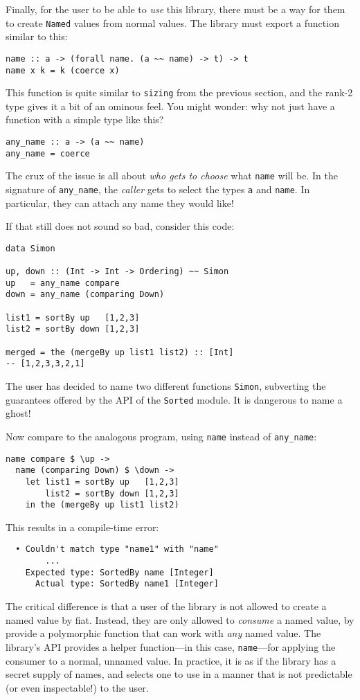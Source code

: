 \documentclass[format=sigplan, review=false, screen=true]{acmart}
\begin{document}
Finally, for the user to be able to \emph{use} this library, there must be a way for
them to create \texttt{Named} values from normal values. The library must export a
function similar to this:

\begin{verbatim}
name :: a -> (forall name. (a ~~ name) -> t) -> t
name x k = k (coerce x)
\end{verbatim}

This function is quite similar to \texttt{sizing} from the previous section, and the rank-2
type gives it a bit of an ominous feel. You might wonder: why not just have a function
with a simple type like this?

\begin{verbatim}
any_name :: a -> (a ~~ name)
any_name = coerce
\end{verbatim}

The crux of the issue is all about \emph{who gets to choose} what \texttt{name} will be.
In the signature of \texttt{any\_name}, the \emph{caller} gets to select the types \texttt{a}
and \texttt{name}. In particular, they can attach any name they would like!

If that still does not sound so bad, consider this code:

\begin{verbatim}
data Simon
  
up, down :: (Int -> Int -> Ordering) ~~ Simon
up   = any_name compare
down = any_name (comparing Down)

list1 = sortBy up   [1,2,3]
list2 = sortBy down [1,2,3]

merged = the (mergeBy up list1 list2) :: [Int]
-- [1,2,3,3,2,1]
\end{verbatim}
\noindent
The user has decided to name two different functions \texttt{Simon}, subverting the
guarantees offered by the API of the \texttt{Sorted} module. It is dangerous to
name a ghost!

Now compare to the analogous program, using \texttt{name} instead of \texttt{any\_name}:
\begin{verbatim}
name compare $ \up ->
  name (comparing Down) $ \down ->
    let list1 = sortBy up   [1,2,3]
        list2 = sortBy down [1,2,3]
    in the (mergeBy up list1 list2)
\end{verbatim}
\noindent
This results in a compile-time error:

\begin{lstlisting}
  • Couldn't match type "name1" with "name"
        ...
    Expected type: SortedBy name [Integer]
      Actual type: SortedBy name1 [Integer]
\end{lstlisting}
\noindent
The critical difference is that a user of the library is not allowed to create a named
value by fiat. Instead, they are only allowed to \emph{consume} a named value, by
provide a polymorphic function that can work with \emph{any} named value. The library's API provides
a helper function---in this case, \texttt{name}---for applying the consumer to a normal, unnamed value.
In practice, it is as if the
library has a secret supply of names, and selects one to use in a manner that is not
predictable (or even inspectable!) to the user.
\end{document}
